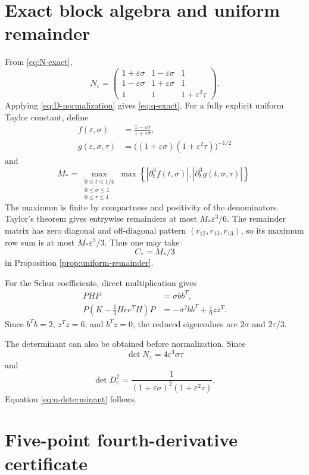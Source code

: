 \documentclass[11pt]{article}
\newcommand{\eps}{\varepsilon}
\begin{document}
\section{Exact block algebra and uniform remainder}
\label{app:uniform-remainder}

From \eqref{eq:N-exact},
\[
  N_\eps=
  \begin{pmatrix}
  1+\eps\sigma&1-\eps\sigma&1\\
  1-\eps\sigma&1+\eps\sigma&1\\
  1&1&1+\eps^2\tau
  \end{pmatrix}.
\]
Applying \eqref{eq:D-normalization} gives \eqref{eq:q-exact}.  For a fully explicit uniform Taylor constant, define
\begin{align*}
  f(\eps,\sigma)&=\frac{1-\eps\sigma}{1+\eps\sigma},\\
  g(\eps,\sigma,\tau)&=\bigl((1+\eps\sigma)(1+\eps^2\tau)\bigr)^{-1/2}
\end{align*}
and
\begin{equation}
  M_*
  =\max_{\substack{0\le t\le1/4\\0\le\sigma\le1\\0\le\tau\le4}}
  \max\left\{
  |\partial_t^3f(t,\sigma)|,
  |\partial_t^3g(t,\sigma,\tau)|
  \right\}.
  \label{eq:M-star}
\end{equation}
The maximum is finite by compactness and positivity of the denominators.  Taylor's theorem gives entrywise remainders at most $M_*\eps^3/6$.  The remainder matrix has zero diagonal and off-diagonal pattern $(r_{12},r_{13},r_{13})$, so its maximum row sum is at most $M_*\eps^3/3$.  Thus one may take
\begin{equation}
  C_*=M_*/3
  \label{eq:C-star}
\end{equation}
in Proposition \ref{prop:uniform-remainder}.

For the Schur coefficients, direct multiplication gives
\begin{align*}
  PHP&=\sigma bb^T,\\
  P\left(K-\frac13Hee^TH\right)P
  &=-\sigma^2bb^T+\frac{\tau}{9}zz^T.
\end{align*}
Since $b^Tb=2$, $z^Tz=6$, and $b^Tz=0$, the reduced eigenvalues are $2\sigma$ and $2\tau/3$.

The determinant can also be obtained before normalization.  Since
\[
  \det N_\eps=4\eps^3\sigma\tau
\]
and
\[
  \det D_\eps^2
  =\frac{1}{(1+\eps\sigma)^2(1+\eps^2\tau)},
\]
Equation \eqref{eq:q-determinant} follows.

\section{Five-point fourth-derivative certificate}
\label{app:five-point}
\end{document}
